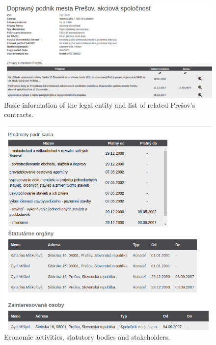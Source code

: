 \documentclass[thesis=B,english]{sprlajur-slovakopendata}[2018/05/12]
\begin{document}
{	\begin{figure}[H]
		\begin{center}
			\includegraphics[scale=0.30]{pictures/partyDetail1.png}
			\caption{Basic information of the legal entity and list of related Prešov's contracts.}
			\label{fig:webapp-partydetail1}
		\end{center}
	\end{figure}
	\begin{figure}[H]
		\begin{center}
			\includegraphics[scale=0.30]{pictures/partyDetail2.png}
			\caption{Economic activities, statutory bodies and stakeholders.}
			\label{fig:webapp-partydetail2}
		\end{center}
	\end{figure}
	
}
\end{document}
